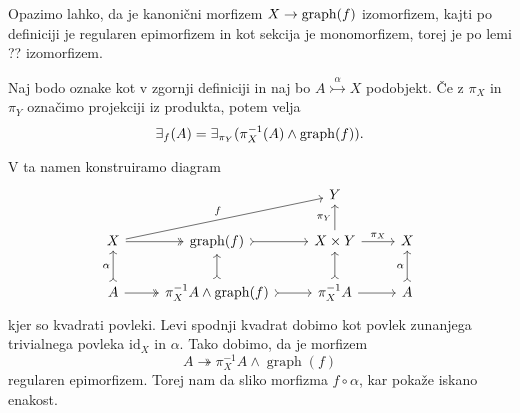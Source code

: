 \documentclass[../kategoricna_logika.tex]{subfiles}
\begin{document}
Opazimo lahko, da je kanonični morfizem $X \to \operatorname{graph}(f)$ izomorfizem,
kajti po definiciji je regularen epimorfizem
in kot sekcija je monomorfizem, torej je po lemi ?? izomorfizem.
\begin{lema}
  Naj bodo oznake kot v zgornji definiciji in naj bo $A \overset{\alpha}{\rightarrowtail} X$ podobjekt. Če z $\pi_X$ in $\pi_Y$ označimo projekciji iz produkta, potem velja
  $$\exists_f(A) = \exists_{\pi_Y}(\pi_X^{-1}(A) \wedge \operatorname{graph}(f)).$$
\end{lema}
\begin{dokaz}
  V ta namen konstruiramo diagram
  \begin{equation*}
  \begin{tikzcd}
    & & Y & \\
    X \ar[urr, "f"] \ar[r, two heads] & \operatorname{graph}(f) \ar[r, tail] & X \times Y \ar[u, "\pi_Y"] \ar[r, "\pi_X"] & X \\
    A \ar[u, tail, "\alpha"] \ar[r, two heads] & \pi_X^{-1}A \land \operatorname{graph}(f) \ar[u, tail] \ar[r, tail] & \pi_X^{-1}A \ar[u, tail] \ar[r] & A \ar[u, tail, "\alpha"]
  \end{tikzcd}
  \end{equation*}
  kjer so kvadrati povleki.
  Levi spodnji kvadrat dobimo kot povlek zunanjega trivialnega povleka $\mathrm{id}_X$ in $\alpha$.
  Tako dobimo, da je morfizem 
  $$A \twoheadrightarrow \pi_X^{-1}A \land \operatorname{graph}(f)$$
  regularen epimorfizem.
  Torej nam da sliko morfizma $f \circ \alpha$, kar pokaže iskano enakost.
\end{dokaz}
\end{document}
